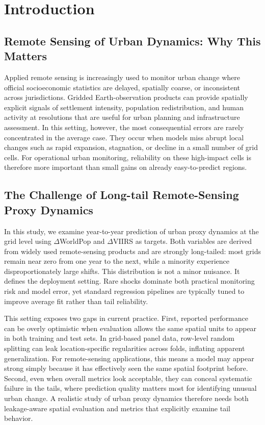 \documentclass[preprint,12pt]{elsarticle}
\begin{document}

\section{Introduction}

\subsection{Remote Sensing of Urban Dynamics: Why This Matters}
Applied remote sensing is increasingly used to monitor urban change where official socioeconomic statistics are delayed, spatially coarse, or inconsistent across jurisdictions. Gridded Earth-observation products can provide spatially explicit signals of settlement intensity, population redistribution, and human activity at resolutions that are useful for urban planning and infrastructure assessment. In this setting, however, the most consequential errors are rarely concentrated in the average case. They occur when models miss abrupt local changes such as rapid expansion, stagnation, or decline in a small number of grid cells. For operational urban monitoring, reliability on these high-impact cells is therefore more important than small gains on already easy-to-predict regions.

\subsection{The Challenge of Long-tail Remote-Sensing Proxy Dynamics}

In this study, we examine year-to-year prediction of urban proxy dynamics at the grid level using $\Delta$WorldPop and $\Delta$VIIRS as targets. Both variables are derived from widely used remote-sensing products and are strongly long-tailed: most grids remain near zero from one year to the next, while a minority experience disproportionately large shifts. This distribution is not a minor nuisance. It defines the deployment setting. Rare shocks dominate both practical monitoring risk and model error, yet standard regression pipelines are typically tuned to improve average fit rather than tail reliability.

This setting exposes two gaps in current practice. First, reported performance can be overly optimistic when evaluation allows the same spatial units to appear in both training and test sets. In grid-based panel data, row-level random splitting can leak location-specific regularities across folds, inflating apparent generalization. For remote-sensing applications, this means a model may appear strong simply because it has effectively seen the same spatial footprint before. Second, even when overall metrics look acceptable, they can conceal systematic failure in the tails, where prediction quality matters most for identifying unusual urban change. A realistic study of urban proxy dynamics therefore needs both leakage-aware spatial evaluation and metrics that explicitly examine tail behavior.
\end{document}
